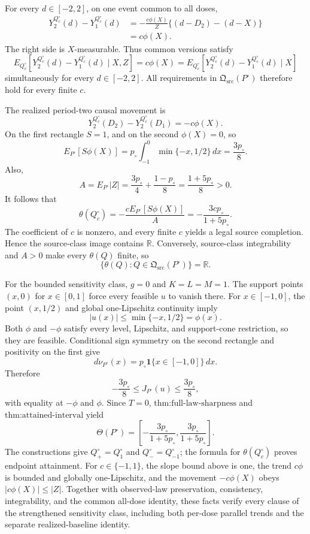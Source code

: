 For every \(d\in[-2,2]\), on one event common to all doses,
\[
 \begin{aligned}
 Y_2^{Q_c^{\circ}}(d)-Y_1^{Q_c^{\circ}}(d)
 &=-\frac{c\phi(X)}Z\{(d-D_2)-(d-X)\}\\
 &=c\phi(X).
 \end{aligned}
\]
The right side is \(X\)-measurable.  Thus common versions satisfy
\[
 E_{Q_c^{\circ}}[Y_2^{Q_c^{\circ}}(d)-Y_1^{Q_c^{\circ}}(d)\mid X,Z]
 =c\phi(X)
 =E_{Q_c^{\circ}}[Y_2^{Q_c^{\circ}}(d)-Y_1^{Q_c^{\circ}}(d)\mid X]
\]
simultaneously for every \(d\in[-2,2]\).  All requirements in \(\mathfrak Q_{\mathrm{src}}(P^{\circ})\) therefore hold for every finite \(c\).

The realized period-two causal movement is
\[
 Y_2^{Q_c^{\circ}}(D_2)-Y_2^{Q_c^{\circ}}(D_1)=-c\phi(X).
\]
On the first rectangle \(S=1\), and on the second \(\phi(X)=0\), so
\[
 E_{P^{\circ}}[S\phi(X)]
 =p_{\circ}\int_{-1}^{0}\min\{-x,1/2\}\,dx
 =\frac{3p_{\circ}}8.
\]
Also,
\[
 A=E_{P^{\circ}}|Z|
 =\frac{3p_{\circ}}4+\frac{1-p_{\circ}}8
 =\frac{1+5p_{\circ}}8>0.
\]
It follows that
\[
 \theta(Q_c^{\circ})
 =-\frac{cE_{P^{\circ}}[S\phi(X)]}{A}
 =-\frac{3cp_{\circ}}{1+5p_{\circ}}.
\]
The coefficient of \(c\) is nonzero, and every finite \(c\) yields a legal source completion.  Hence the source-class image contains \(\mathbb R\).  Conversely, source-class integrability and \(A>0\) make every \(\theta(Q)\) finite, so
\[
 \{\theta(Q):Q\in\mathfrak Q_{\mathrm{src}}(P^{\circ})\}=\mathbb R.
\]

For the bounded sensitivity class, \(g=0\) and \(K=L=M=1\).  The support points \((x,0)\) for \(x\in[0,1]\) force every feasible \(u\) to vanish there.  For \(x\in[-1,0]\), the point \((x,1/2)\) and global one-Lipschitz continuity imply
\[
 |u(x)|\leq\min\{-x,1/2\}=\phi(x).
\]
Both \(\phi\) and \(-\phi\) satisfy every level, Lipschitz, and support-cone restriction, so they are feasible.  Conditional sign symmetry on the second rectangle and positivity on the first give
\[
 d\nu_{P^{\circ}}(x)=p_{\circ}\mathbf1\{x\in[-1,0]\}\,dx.
\]
Therefore
\[
 -\frac{3p_{\circ}}8\leq J_{P^{\circ}}(u)\leq\frac{3p_{\circ}}8,
\]
with equality at \(-\phi\) and \(\phi\).  Since \(T=0\), \(\text{thm:full-law-sharpness}\) and \(\text{thm:attained-interval}\) yield
\[
 \Theta(P^{\circ})=
 \left[-\frac{3p_{\circ}}{1+5p_{\circ}},
        \frac{3p_{\circ}}{1+5p_{\circ}}\right].
\]
The constructions give \(Q_+^{\circ}=Q_1^{\circ}\) and \(Q_-^{\circ}=Q_{-1}^{\circ}\); the formula for \(\theta(Q_c^{\circ})\) proves endpoint attainment.  For \(c\in\{-1,1\}\), the slope bound above is one, the trend \(c\phi\) is bounded and globally one-Lipschitz, and the movement \(-c\phi(X)\) obeys \(|c\phi(X)|\leq|Z|\).  Together with observed-law preservation, consistency, integrability, and the common all-dose identity, these facts verify every clause of the strengthened sensitivity class, including both per-dose parallel trends and the separate realized-baseline identity.

